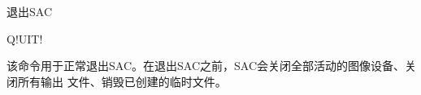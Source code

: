 \label{cmd:quit}

退出SAC

\begin{SACSTX}
Q!UIT!
\end{SACSTX}

该命令用于正常退出SAC。在退出SAC之前，SAC会关闭全部活动的图像设备、关闭所有输出
文件、销毁已创建的临时文件。
